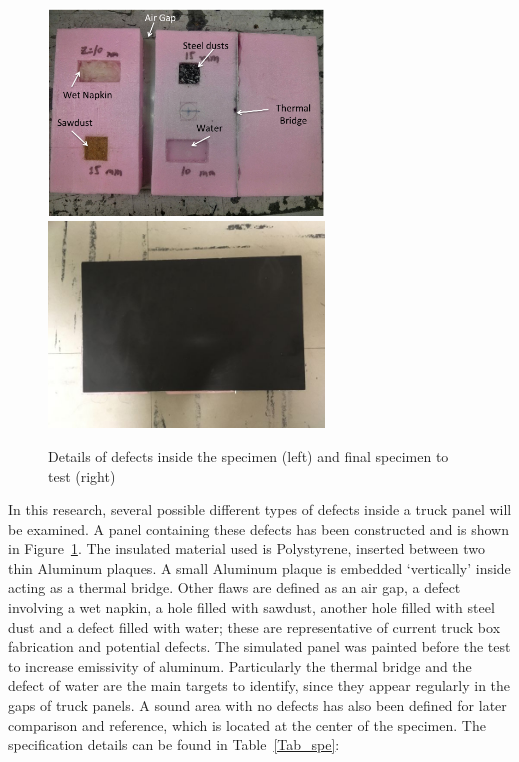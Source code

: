 \documentclass{tQRT2e}
\begin{document}
\begin{figure}
	\includegraphics[width=7.33cm, height=5.5cm]{Panel_detail}
	\includegraphics[width=7.33cm, height=5.5cm]{Panel_done}
	\caption{Details of defects inside the specimen (left) and final specimen to test (right) }
	\label{panel}
\end{figure}
\indent \indent In this research, several possible different types of defects inside a truck panel will be examined.  A panel containing these defects has been constructed and is shown in Figure~\ref{panel}. The insulated material used is Polystyrene, inserted between two thin Aluminum plaques. A small Aluminum plaque is embedded ‘vertically’ inside acting as a thermal bridge. Other flaws are defined as an air gap, a defect involving a wet napkin, a hole filled with sawdust, another hole filled with steel dust and a defect filled with water; these are representative of current truck box fabrication and potential defects. The simulated panel was painted before the test to increase emissivity of aluminum. Particularly the thermal bridge and the defect of water are the main targets to identify, since they appear regularly in the gaps of truck panels. A sound area with no defects has also been defined for later comparison and reference, which is located at the center of the specimen. The specification details can be found in Table~\ref{Tab_spe}:
\end{document}
